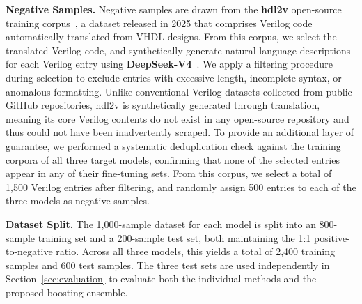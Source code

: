 \textbf{Negative Samples.} Negative samples are drawn from the \textbf{hdl2v} open-source training corpus~\cite{hong2025hdl2v}, a dataset released in 2025 that comprises Verilog code automatically translated from VHDL designs. From this corpus, we select the translated Verilog code, and synthetically generate natural language descriptions  for each Verilog entry using \textbf{DeepSeek-V4}~\cite{xu2026deepseek}. We apply a filtering procedure during selection to exclude entries with excessive length, incomplete syntax, or anomalous formatting. Unlike conventional Verilog datasets collected from public GitHub repositories, hdl2v is synthetically generated through translation, meaning its core Verilog contents do not exist in any open-source repository and thus could not have been inadvertently scraped. To provide an additional layer of guarantee, we performed a systematic deduplication check against the training corpora of all three target models, confirming that none of the selected entries appear in any of their fine-tuning sets. From this corpus, we select a total of 1,500 Verilog entries after filtering, and randomly assign 500 entries to each of the three models as negative samples.

\textbf{Dataset Split.} The 1,000-sample dataset for each model is split into an 800-sample training set and a 200-sample test set, both maintaining the 1:1 positive-to-negative ratio. Across all three models, this yields a total of 2,400 training samples and 600 test samples. The three test sets are used independently in Section~\ref{sec:evaluation} to evaluate both the individual methods and the proposed boosting ensemble.

